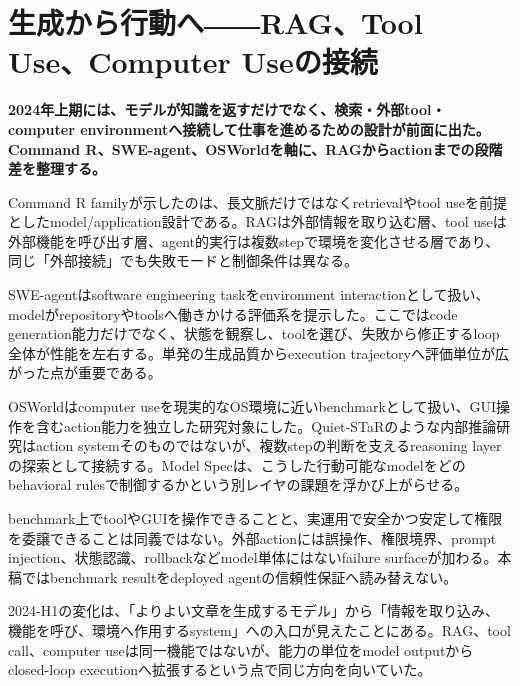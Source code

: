 \section{生成から行動へ――RAG、Tool Use、Computer Useの接続}
\label{pkg:action-rag-agents}
\noindent\textbf{2024年上期には、モデルが知識を返すだけでなく、検索・外部tool・computer environmentへ接続して仕事を進めるための設計が前面に出た。Command R、SWE-agent、OSWorldを軸に、RAGからactionまでの段階差を整理する。}\autocite{src-1c9f1d22c176,src-70b5d4b3bedd,src-77e35e5f22be}

Command R familyが示したのは、長文脈だけではなくretrievalやtool useを前提としたmodel/application設計である。RAGは外部情報を取り込む層、tool useは外部機能を呼び出す層、agent的実行は複数stepで環境を変化させる層であり、同じ「外部接続」でも失敗モードと制御条件は異なる。\autocite{src-77e35e5f22be}


SWE-agentはsoftware engineering taskをenvironment interactionとして扱い、modelがrepositoryやtoolsへ働きかける評価系を提示した。ここではcode generation能力だけでなく、状態を観察し、toolを選び、失敗から修正するloop全体が性能を左右する。単発の生成品質からexecution trajectoryへ評価単位が広がった点が重要である。\autocite{src-1c9f1d22c176}


OSWorldはcomputer useを現実的なOS環境に近いbenchmarkとして扱い、GUI操作を含むaction能力を独立した研究対象にした。Quiet-STaRのような内部推論研究はaction systemそのものではないが、複数stepの判断を支えるreasoning layerの探索として接続する。Model Specは、こうした行動可能なmodelをどのbehavioral rulesで制御するかという別レイヤの課題を浮かび上がらせる。\autocite{src-12fa04e64d24,src-70b5d4b3bedd,src-d1406200c99e}


\begin{claimboundary}
benchmark上でtoolやGUIを操作できることと、実運用で安全かつ安定して権限を委譲できることは同義ではない。外部actionには誤操作、権限境界、prompt injection、状態認識、rollbackなどmodel単体にはないfailure surfaceが加わる。本稿ではbenchmark resultをdeployed agentの信頼性保証へ読み替えない。\autocite{src-1c9f1d22c176,src-2f7e28810d05,src-70b5d4b3bedd,src-77e35e5f22be,src-edd253654067}
\end{claimboundary}

2024-H1の変化は、「よりよい文章を生成するモデル」から「情報を取り込み、機能を呼び、環境へ作用するsystem」への入口が見えたことにある。RAG、tool call、computer useは同一機能ではないが、能力の単位をmodel outputからclosed-loop executionへ拡張するという点で同じ方向を向いていた。\autocite{src-1c9f1d22c176,src-70b5d4b3bedd,src-77e35e5f22be,src-d1406200c99e}
